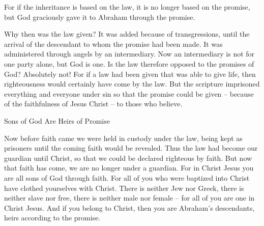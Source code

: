 {For
if
the inheritance
is based on
the law,
it is no longer
based on
the promise,
but
God
graciously gave
it to Abraham
through
the promise.
\par }{\PP {}Why
then
was the law
given? It was added
because of transgressions,
until
the arrival
of the descendant
to whom
the promise
had been made. It was administered
through
angels
by
an intermediary.
Now
an intermediary
is
not
for one
party alone, but
God
is
one.
Is the law
therefore
opposed
to the promises
of God? Absolutely
not! For
if
a law
had been given
that was able
to give life,
then righteousness
would certainly
have come by
the law.
But
the scripture
imprisoned
everything and everyone
under
sin
so that
the promise
could be given
– because of
the faithfulness
of Jesus
Christ
– to those who believe.
\par }{\SH Sons of God Are Heirs of Promise
\par }{\PP {}Now before
faith
came
we were held in custody
under
the law,
being kept as prisoners
until
the coming
faith
would be revealed.
Thus
the law
had become
our
guardian
until
Christ,
so that
we could be declared righteous
by
faith.
But
now that faith
has come,
we are
no longer
under
a guardian.
For
in
Christ
Jesus
you are
all
sons
of God
through
faith.
For
all
of you who were baptized
into
Christ
have clothed
yourselves with Christ.
There is
neither
Jew
nor
Greek,
there is
neither
slave
nor
free,
there is
neither
male
nor
female –
for
all
of you
are
one
in
Christ
Jesus.
And
if
you
belong to Christ,
then
you are
Abraham’s
descendants,
heirs
according to
the promise.

}
